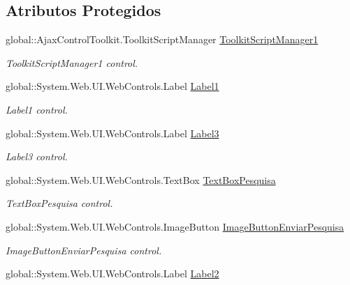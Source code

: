 \subsection*{Atributos Protegidos}
\begin{DoxyCompactItemize}
\item 
global::AjaxControlToolkit.ToolkitScriptManager \hyperlink{class_sistema_r_h_1_1_web_form_log_a4d4defd71dc13bad20e662b952d41987}{ToolkitScriptManager1}
\begin{DoxyCompactList}\small\item\em ToolkitScriptManager1 control. \item\end{DoxyCompactList}\item 
global::System.Web.UI.WebControls.Label \hyperlink{class_sistema_r_h_1_1_web_form_log_ab6184334e610eb3f6392a2e5dc16c167}{Label1}
\begin{DoxyCompactList}\small\item\em Label1 control. \item\end{DoxyCompactList}\item 
global::System.Web.UI.WebControls.Label \hyperlink{class_sistema_r_h_1_1_web_form_log_a8c408c2975991423128b56334b0a5320}{Label3}
\begin{DoxyCompactList}\small\item\em Label3 control. \item\end{DoxyCompactList}\item 
global::System.Web.UI.WebControls.TextBox \hyperlink{class_sistema_r_h_1_1_web_form_log_adfb04da26612dd2d1f2e35b5363422bb}{TextBoxPesquisa}
\begin{DoxyCompactList}\small\item\em TextBoxPesquisa control. \item\end{DoxyCompactList}\item 
global::System.Web.UI.WebControls.ImageButton \hyperlink{class_sistema_r_h_1_1_web_form_log_a6162fa2a5747787d0ad79ce5aa725cbb}{ImageButtonEnviarPesquisa}
\begin{DoxyCompactList}\small\item\em ImageButtonEnviarPesquisa control. \item\end{DoxyCompactList}\item 
global::System.Web.UI.WebControls.Label \hyperlink{class_sistema_r_h_1_1_web_form_log_a038a355f0032298568246d0516bdc4a2}{Label2}

\end{DoxyCompactItemize}
